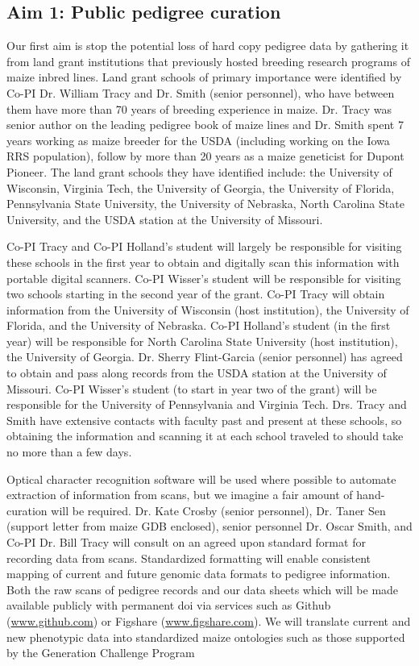 \documentclass[12pt]{article}
\begin{document}
\subsection*{Aim 1: Public pedigree curation}
Our first aim is stop the potential loss of hard copy pedigree data by gathering it from land grant institutions that previously hosted breeding research programs of maize inbred lines. 
Land grant schools of primary importance were identified by Co-PI Dr. William Tracy and  Dr. Smith (senior personnel), who have between them have more than 70 years of breeding experience in maize. 
Dr. Tracy was senior author on the leading pedigree book of maize lines \cite{gerdes1993compilation} and Dr. Smith spent 7 years working as maize breeder for the USDA (including working on the Iowa RRS population), follow by more than 20 years as a maize geneticist for Dupont Pioneer. The land grant schools they have identified include: the University of Wisconsin, Virginia Tech, the University of Georgia, the University of Florida, Pennsylvania State University, the University of Nebraska, North Carolina State University, and the USDA station at the University of Missouri. 

Co-PI Tracy and Co-PI Holland's student will largely be responsible for visiting these schools in the first year to obtain and digitally scan this information with portable digital scanners. 
Co-PI Wisser's student will be responsible for visiting two schools starting in the second year of the grant.
Co-PI  Tracy will obtain information from the University of Wisconsin (host institution), the University of Florida, and the University of Nebraska. 
Co-PI Holland's student (in the first year) will be responsible for North Carolina State University (host institution), the University of Georgia.
Dr. Sherry Flint-Garcia (senior personnel) has agreed to obtain and pass along records from the USDA station at the University of Missouri. 
Co-PI Wisser's student (to start in year two of the grant) will be responsible for the University of Pennsylvania and Virginia Tech.
Drs. Tracy and Smith have extensive contacts with faculty past and present at these schools, so obtaining the information and scanning it at each school traveled to should take no more than a few days. 

Optical character recognition software will be used where possible to automate extraction of information from scans, but we imagine a fair amount of hand-curation will be required.
Dr. Kate Crosby (senior personnel), Dr. Taner Sen (support letter from maize GDB enclosed), senior personnel Dr. Oscar Smith, and Co-PI Dr. Bill Tracy will consult on an agreed upon standard format for recording data from scans.
Standardized formatting will enable consistent mapping of current and future genomic data formats to pedigree information. Both the raw scans of pedigree records and our data sheets which will be made available publicly with permanent doi via services such as Github (\url{www.github.com}) or Figshare (\url{www.figshare.com}).
We will translate current and new phenotypic data into standardized maize ontologies such as those supported by the Generation Challenge Program \citep[\url{http://www.cropontology.org/ontology/CO_322/Maize}, ][]{shrestha2012bridging}
\end{document}
